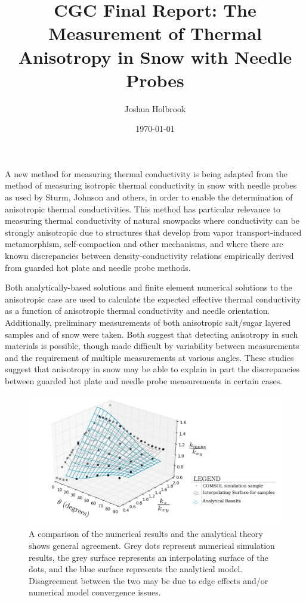 \documentclass{article}
\title{CGC Final Report: The Measurement of Thermal Anisotropy in Snow with Needle Probes}
\author{Joshua Holbrook}
\date{\today}
\begin{document}
\maketitle

A new method for measuring thermal conductivity is being adapted from 
the method of measuring isotropic thermal conductivity in snow with needle
probes as used by Sturm, Johnson and others, in order to enable the
determination of anisotropic thermal conductivities. This
method has particular relevance to measuring thermal conductivity of natural
snowpacks where conductivity can be strongly anisotropic due to structures that
develop from vapor transport-induced metamorphism, self-compaction and other
mechanisms, and where there are known discrepancies between density-conductivity
relations empirically derived from guarded hot plate and needle probe methods.

Both analytically-based solutions and finite element numerical solutions to the
anisotropic case are used to calculate the expected effective thermal
conductivity as a function of anisotropic thermal conductivity and needle
orientation. Additionally, preliminary measurements of both anisotropic salt/sugar
layered samples and of snow were taken. Both suggest that detecting anisotropy
in such materials is possible, though made difficult by variability between
measurements and the requirement of multiple
measurements at various angles. These studies suggest that
anisotropy in snow may be able to explain in part the discrepancies between
guarded hot plate and needle probe measurements in certain cases.

\begin{figure}[h]
\centering
\includegraphics[width=\textwidth]{numvanal.png}
\caption{A comparison of the numerical results and the analytical theory shows
general agreement. Grey dots represent numerical simulation results, the grey surface represents an interpolating surface of the dots, and the blue surface represents the analytical model. Disagreement between the two may be due to edge effects and/or numerical
model convergence issues.}
\label{fig:numvanal}
\end{figure}
\end{document}
